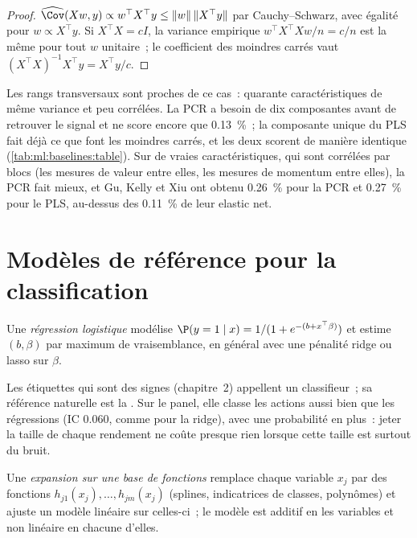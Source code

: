 \begin{proof}
$\widehat{\Cov}(Xw, y)\propto w^\top X^\top y \le \lVert w\rVert\,\lVert X^\top y\rVert$ par Cauchy--Schwarz, avec égalité
pour $w\propto X^\top y$. Si $X^\top X = cI$, la variance empirique $w^\top X^\top Xw/n = c/n$ est la même pour tout $w$ unitaire~;
le coefficient des moindres carrés vaut $(X^\top X)^{-1}X^\top y = X^\top y/c$.
\end{proof}

Les rangs transversaux sont proches de ce cas~: quarante caractéristiques de même variance et peu corrélées. La PCR a besoin
de dix composantes avant de retrouver le signal et ne score encore que 0.13~\%~; la composante unique du PLS fait déjà ce que font
les moindres carrés, et les deux scorent de manière identique (\cref{tab:ml:baselines:table}). Sur de vraies caractéristiques, qui sont
corrélées par blocs (les mesures de valeur entre elles, les mesures de momentum entre elles), la PCR fait mieux, et Gu,
Kelly et Xiu ont obtenu 0.26~\% pour la PCR et 0.27~\% pour le PLS, au-dessus des 0.11~\% de leur elastic net.

\section{Modèles de référence pour la classification}

\begin{definition}\label{def:ml:linear-and-regularised-baselines:logistic}
Une \emph{régression logistique} modélise $\P(y = 1\mid x) = 1/(1 + e^{-(b + x^\top\beta)})$ et estime
$(b,\beta)$ par maximum de vraisemblance, en général avec une pénalité ridge ou lasso sur $\beta$.
\end{definition}

Les étiquettes qui sont des signes (chapitre~2) appellent un classifieur~; sa référence naturelle est la . Sur le panel, elle
classe les actions aussi bien que les régressions (IC 0.060, comme pour la ridge), avec une probabilité en plus~: jeter la
taille de chaque rendement ne coûte presque rien lorsque cette taille est surtout du bruit.

\begin{definition}\label{def:ml:linear-and-regularised-baselines:basis}
Une \emph{expansion sur une base de fonctions} remplace chaque variable $x_j$ par des fonctions $h_{j1}(x_j),\dots,h_{jm}(x_j)$
(splines, indicatrices de classes, polynômes) et ajuste un modèle linéaire sur celles-ci~; le modèle est additif en les variables et
non linéaire en chacune d'elles.
\end{definition}


